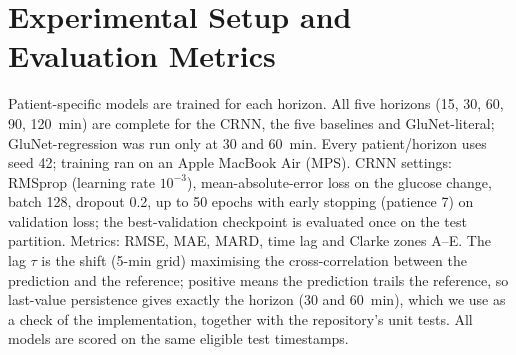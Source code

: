 \documentclass[conference]{IEEEtran}
\begin{document}
\section{Experimental Setup and Evaluation Metrics}
Patient-specific models are trained for each horizon. All five horizons (15, 30, 60, 90, 120~min) are complete for the CRNN, the five baselines and GluNet-literal; GluNet-regression was run only at 30 and 60~min. Every patient/horizon uses seed 42; training ran on an Apple MacBook Air (MPS). CRNN settings: RMSprop (learning rate $10^{-3}$), mean-absolute-error loss on the glucose change, batch 128, dropout 0.2, up to 50 epochs with early stopping (patience 7) on validation loss; the best-validation checkpoint is evaluated once on the test partition. Metrics: RMSE, MAE, MARD, time lag and Clarke zones A--E. The lag $\tau$ is the shift (5-min grid) maximising the cross-correlation between the prediction and the reference; positive means the prediction trails the reference, so last-value persistence gives exactly the horizon (30 and 60~min), which we use as a check of the implementation, together with the repository's unit tests. All models are scored on the same eligible test timestamps.
\end{document}
